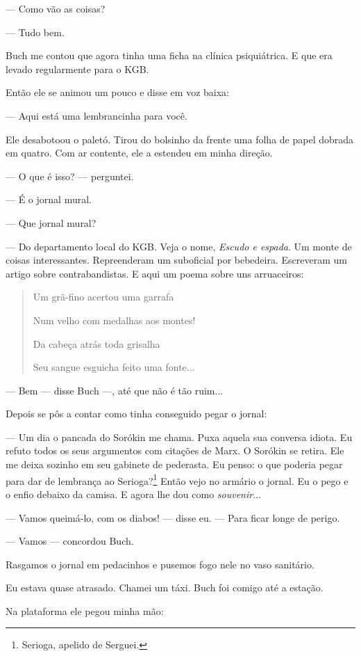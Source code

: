 --- Como vão as coisas?

--- Tudo bem.

Buch me contou que agora tinha uma ficha na clínica psiquiátrica. E que
era levado regularmente para o KGB.

Então ele se animou um pouco e disse em voz baixa:

--- Aqui está uma lembrancinha para você.

Ele desabotoou o paletó. Tirou do bolsinho da frente uma folha de papel
dobrada em quatro. Com ar contente, ele a estendeu em minha direção.

--- O que é isso? --- perguntei.

--- É o jornal mural.

--- Que jornal mural?

--- Do departamento local do KGB. Veja o nome, \emph{Escudo e espada}.
Um monte de coisas interessantes. Repreenderam um suboficial por
bebedeira. Escreveram um artigo sobre contrabandistas. E aqui um poema
sobre uns arruaceiros:

\begin{quote}
Um grã-fino acertou uma garrafa

Num velho com medalhas aos montes!

Da cabeça atrás toda grisalha

Seu sangue esguicha feito uma fonte...
\end{quote}

--- Bem --- disse Buch ---, até que não é tão ruim...

Depois se pôs a contar como tinha conseguido pegar o jornal:

--- Um dia o pancada do Sorókin me chama. Puxa aquela sua conversa
idiota. Eu refuto todos os seus argumentos com citações de Marx. O
Sorókin se retira. Ele me deixa sozinho em seu gabinete de pederasta. Eu
penso: o que poderia pegar para dar de lembrança ao Serioga?\footnote{Serioga,
  apelido de Serguei.} Então vejo no armário o jornal. Eu o pego e o
enfio debaixo da camisa. E agora lhe dou como \emph{souvenir}...

--- Vamos queimá-lo, com os diabos! --- disse eu. --- Para ficar longe
de perigo.

--- Vamos --- concordou Buch.

Rasgamos o jornal em pedacinhos e pusemos fogo nele no vaso sanitário.

Eu estava quase atrasado. Chamei um táxi. Buch foi comigo até a estação.

Na plataforma ele pegou minha mão:

